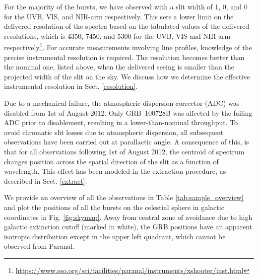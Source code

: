 \documentclass{aa}    %
\begin{document}
For the majority of the bursts, we have observed with a slit width of 1,
0, and 0 for the UVB, VIS, and NIR-arm respectively. This sets a
lower limit on the delivered resolution of the spectra based on the tabulated
values of the delivered resolutions, which is 4350, 7450, and 5300 for the UVB,
VIS and NIR-arm
respectively\footnote{\url{https://www.eso.org/sci/facilities/paranal/instruments/xshooter/inst.html}}. %
For accurate measurements involving line profiles, knowledge of the precise
instrumental resolution is required. The resolution becomes better than the
nominal one, listed above, when the delivered seeing is smaller than the
projected width of the slit on the sky. We discuss how we determine the
effective instrumental resolution in Sect. \ref{resolution}.

Due to a mechanical failure, the atmospheric dispersion corrector (ADC) was
disabled from 1st of August 2012. Only GRB~100728B was affected by the failing
ADC prior to disablement, resulting in a lower-than-nominal throughput. To avoid
chromatic slit losses due to atmospheric dispersion, all subsequent observations
have been carried out at parallactic angle. A consequence of this, is that for
all observations following 1st of August 2012, the centroid of spectrum changes
position across the spatial direction of the slit as a function of wavelength.
This effect has been modeled in the extraction procedure, as described in Sect. 
\ref{extract}.



We provide an overview of all the observations in Table
\ref{tab:sample_overview} and plot the positions of all the bursts on the
celestial sphere in galactic coordinates in Fig. \ref{fig:skymap}. Away from
central zone of avoidance due to high galactic extinction cutoff (marked in
white), the GRB positions have an apparent isotropic distribution except in the
upper left quadrant, which cannot be observed from Paranal.
\end{document}

